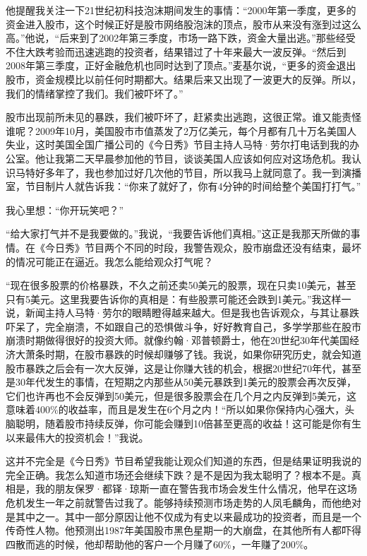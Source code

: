 他提醒我关注一下21世纪初科技泡沫期间发生的事情：“2000年第一季度，更多的资金进入股市，这个时候正好是股市网络股泡沫的顶点，股市从来没有涨到过这么高。”他说，“后来到了2002年第三季度，市场一路下跌，资金大量出逃。”那些经受不住大跌考验而迅速逃跑的投资者，结果错过了十年来最大一波反弹。“然后到2008年第三季度，正好金融危机也同时达到了顶点。”麦基尔说，“更多的资金退出股市，资金规模比以前任何时期都大。结果后来又出现了一波更大的反弹。所以，我们的情绪掌控了我们。我们被吓坏了。”

股市出现前所未见的暴跌，我们被吓坏了，赶紧卖出逃跑，这很正常。谁又能责怪谁呢？2009年10月，美国股市市值蒸发了2万亿美元，每个月都有几十万名美国人失业，这时美国全国广播公司的《今日秀》节目主持人马特·劳尔打电话到我的办公室。他让我第二天早晨参加他的节目，谈谈美国人应该如何应对这场危机。我认识马特好多年了，我也参加过好几次他的节目，所以我马上就同意了。我一到演播室，节目制片人就告诉我：“你来了就好了，你有4分钟的时间给整个美国打打气。”

我心里想：“你开玩笑吧？”

“给大家打气并不是我要做的。”我说，“我要告诉他们真相。”这正是我那天所做的事情。在《今日秀》节目两个不同的时段，我警告观众，股市崩盘还没有结束，最坏的情况可能正在逼近。我怎么能给观众打气呢？

“现在很多股票的价格暴跌，不久之前还卖50美元的股票，现在只卖10美元，甚至只有5美元。这里我要告诉你的真相是：有些股票可能还会跌到1美元。”我这样一说，新闻主持人马特·劳尔的眼睛瞪得越来越大。但是我也告诉观众，与其让暴跌吓呆了，完全崩溃，不如跟自己的恐惧做斗争，好好教育自己，多学学那些在股市崩溃时期做得很好的投资大师。就像约翰·邓普顿爵士，他在20世纪30年代美国经济大萧条时期，在股市暴跌的时候却赚够了钱。我说，如果你研究历史，就会知道股市暴跌之后会有一次大反弹，这是让你赚大钱的机会，根据20世纪70年代，甚至是30年代发生的事情，在短期之内那些从50美元暴跌到1美元的股票会再次反弹，它们也许再也不会反弹到50美元，但是很多股票会在几个月之内反弹到5美元，这意味着400\%的收益率，而且是发生在6个月之内！“所以如果你保持内心强大，头脑聪明，随着股市持续反弹，你可能会赚到10倍甚至更高的收益！这可能是你有生以来最伟大的投资机会！”我说。

这并不完全是《今日秀》节目希望我能让观众们知道的东西，但是结果证明我说的完全正确。我怎么知道市场还会继续下跌？是不是因为我太聪明了？根本不是。真相是，我的朋友保罗·都铎·琼斯一直在警告我市场会发生什么情况，他早在这场危机发生一年之前就警告过我了。能够持续预测市场走势的人凤毛麟角，而他绝对是其中之一。其中一部分原因让他不仅成为有史以来最成功的投资者，而且是一个传奇性人物。他预测出1987年美国股市黑色星期一的大崩盘，在其他所有人都吓得四散而逃的时候，他却帮助他的客户一个月赚了60\%，一年赚了200\%。


